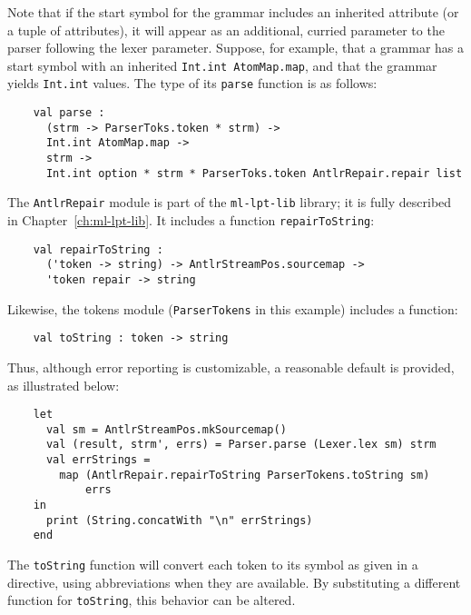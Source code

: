 Note that if the start symbol for the grammar includes an inherited attribute (or a tuple of attributes), it will appear as an additional, curried parameter to the parser following the lexer parameter.  Suppose, for example, that a grammar has a start symbol with an inherited {\tt Int.int AtomMap.map}, and that the grammar yields {\tt Int.int} values.  The type of its {\tt parse} function is as follows:
\begin{verbatim}
    val parse : 
      (strm -> ParserToks.token * strm) -> 
      Int.int AtomMap.map -> 
      strm -> 
      Int.int option * strm * ParserToks.token AntlrRepair.repair list
\end{verbatim}

The {\tt AntlrRepair} module is part of the {\tt ml-lpt-lib} library; it is fully described in Chapter~\ref{ch:ml-lpt-lib}.  It includes a function {\tt repairToString}:
\begin{verbatim}
    val repairToString : 
      ('token -> string) -> AntlrStreamPos.sourcemap -> 
      'token repair -> string

\end{verbatim}
Likewise, the tokens module ({\tt ParserTokens} in this example) includes a function:
\begin{verbatim}
    val toString : token -> string
\end{verbatim}
Thus, although error reporting is customizable, a reasonable default is provided, as illustrated below:
\begin{verbatim}
    let
      val sm = AntlrStreamPos.mkSourcemap()
      val (result, strm', errs) = Parser.parse (Lexer.lex sm) strm
      val errStrings = 
        map (AntlrRepair.repairToString ParserTokens.toString sm)
            errs
    in
      print (String.concatWith "\n" errStrings)
    end
\end{verbatim}
The {\tt toString} function will convert each token to its symbol as given in a  directive, using abbreviations when they are available. By substituting a different function for {\tt toString}, this behavior can be altered.